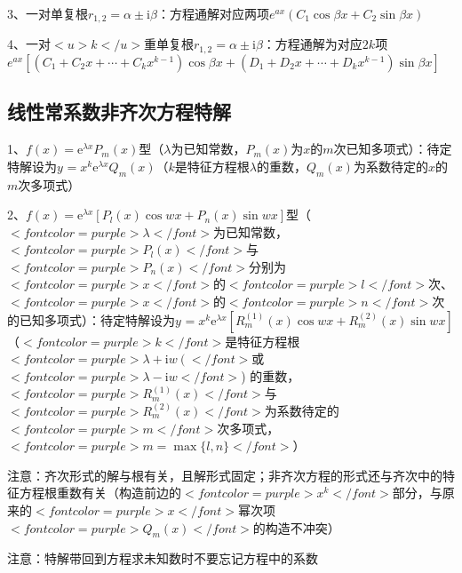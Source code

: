 3、一对单复根$ r_{1,2}=\alpha \pm \mathrm{i} \beta $：方程通解对应两项$ {e}^{a x}\left(C_{1} \cos \beta x+C_{2} \sin \beta x\right) $

4、一对$ <u>k</u> $重单复根$ r_{1,2}=\alpha \pm \mathrm{i} \beta $：方程通解为对应$ 2k $项$ {e}^{{ax}}[(C_{1}+C_{2} x+\cdots+C_{k} x^{k-1}) \cos \beta x+(D_{1}+D_{2} x+\cdots+D_{k} x^{k-1}) \sin \beta x] $



\subsection{线性常系数非齐次方程特解}

1、$ f(x)=\mathrm{e}^{\lambda x} P_{m}(x) $型（$ \lambda $为已知常数，$ P_{m}(x) $为$ x $的$ m $次已知多项式）：待定特解设为$ y^{}=x^{k} \mathrm{e}^{\lambda x} Q_{m}(x) $（$ k $是特征方程根$ \lambda $的重数，$ Q_{m}(x) $为系数待定的$ x $的$ m $次多项式）

2、$ f(x)=\mathrm{e}^{\lambda x}\left[P_{l}(x) \cos w x+P_{n}(x) \sin w x\right] $型（$ <font color=purple>\lambda</font> $为已知常数，$ <font color=purple>P_{l}(x)</font> $与$ <font color=purple>P_{n}(x)</font> $分别为$ <font color=purple>x</font> $的$ <font color=purple>l</font> $次、$ <font color=purple>x</font> $的$ <font color=purple>n</font> $次的已知多项式）：待定特解设为$ y^{}=x^{k} \mathrm{e}^{\lambda x}\left[R_{m}^{(1)}(x) \cos w x+R_{m}^{(2)}(x) \sin w x\right] $（$ <font color=purple>k</font> $是特征方程根$ <font color=purple>\lambda+\mathrm{i} w\left(\right.</font> $或$ <font color=purple>\lambda-\mathrm{i} w</font> $) 的重数，$ <font color=purple>R_{m}^{(1)}(x)</font> $与$ <font color=purple>R_{m}^{(2)}(x)</font> $为系数待定的$ <font color=purple>m</font> $次多项式，$ <font color=purple>m=\max \{l, n\}</font> $）

注意：齐次形式的解与根有关，且解形式固定；非齐次方程的形式还与齐次中的特征方程根重数有关（构造前边的$ <font color=purple>x^{k}</font> $部分，与原来的$ <font color=purple>x</font> $幂次项$ <font color=purple>Q_{m}(x)</font> $的构造不冲突）

注意：特解带回到方程求未知数时不要忘记方程中的系数

